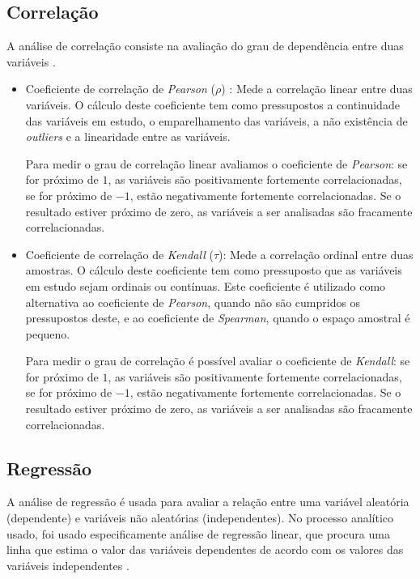 \documentclass[conference]{IEEEtran}
\begin{document}
\subsection{Correlação}            

A análise de correlação consiste na avaliação do grau de dependência entre duas variáveis \cite{Morettin_Bussab_2010}.

\begin{itemize}
    \item Coeficiente de correlação de \textit{Pearson} ($\rho$) : Mede a correlação linear entre duas variáveis. O cálculo deste coeficiente tem como pressupostos a continuidade das variáveis em estudo, o emparelhamento das variáveis, a não existência de \textit{outliers} e a linearidade entre as variáveis.

Para medir o grau de correlação linear avaliamos o coeficiente de \textit{Pearson}: se for próximo de $1$, as variáveis são positivamente fortemente correlacionadas, se for próximo de $-1$, estão negativamente fortemente correlacionadas. Se o resultado estiver próximo de zero, as variáveis a ser analisadas são fracamente correlacionadas.

    \item Coeficiente de correlação de \textit{Kendall} ($\tau$): Mede a correlação ordinal entre duas amostras. O cálculo deste coeficiente tem como pressuposto que as variáveis em estudo sejam ordinais ou contínuas. Este coeficiente é utilizado como alternativa ao coeficiente de \textit{Pearson}, quando não são cumpridos os pressupostos deste, e ao coeficiente de \textit{Spearman}, quando o espaço amostral é pequeno.

Para medir o grau de correlação é possível avaliar o coeficiente de \textit{Kendall}: se for próximo de $1$, as variáveis são positivamente fortemente correlacionadas, se for próximo de $-1$, estão negativamente fortemente correlacionadas. Se o resultado estiver próximo de zero, as variáveis a ser analisadas são fracamente correlacionadas.

\end{itemize}

\subsection{Regressão}

A análise de regressão é usada para avaliar a relação entre uma variável aleatória (dependente) e variáveis não aleatórias (independentes). No processo analítico usado, foi usado especificamente análise de regressão linear, que procura uma linha que estima o valor das variáveis dependentes de acordo com os valores das variáveis independentes \cite{freedman_2009}.
\end{document}
